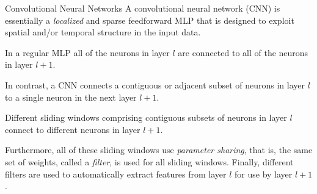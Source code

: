 \begin{frame}{Convolutional Neural Networks}
A convolutional neural network (CNN) is essentially a {\em localized}
and sparse
feedforward MLP that is designed to exploit spatial and/or temporal 
structure in the
input data. 

\medskip

In a regular MLP all of the neurons in layer $l$ are
connected to all of the neurons in layer $l+1$. 

\medskip

In contrast, a CNN 
connects a contiguous or adjacent subset of neurons in layer
$l$ to a single neuron in the next layer $l+1$. 

\medskip

Different sliding
windows comprising contiguous subsets of neurons in layer $l$ connect to
different neurons in layer $l+1$. 

\medskip

Furthermore, all of these sliding
windows use
{\em parameter sharing}, that is, the same set of weights, called a {\em
filter}, is used for
all sliding windows. Finally, different filters are used to
automatically extract features from layer $l$ for use
by layer $l+1$.
\end{frame}

